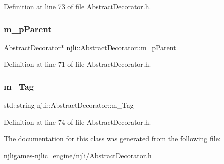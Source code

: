 Definition at line 73 of file Abstract\+Decorator.\+h.

\mbox{\label{classnjli_1_1_abstract_decorator_a2c8fc57dd9d1a874a23ae51277a8968d}} 
\subsubsection{\texorpdfstring{m\+\_\+p\+Parent}{m\_pParent}}
{\footnotesize\ttfamily \mbox{\hyperlink{classnjli_1_1_abstract_decorator}{Abstract\+Decorator}}$\ast$ njli\+::\+Abstract\+Decorator\+::m\+\_\+p\+Parent\hspace{0.3cm}{\ttfamily [private]}}



Definition at line 71 of file Abstract\+Decorator.\+h.

\mbox{\label{classnjli_1_1_abstract_decorator_a2a7abd533134461d07b660eba804cf48}} 
\subsubsection{\texorpdfstring{m\+\_\+\+Tag}{m\_Tag}}
{\footnotesize\ttfamily std\+::string njli\+::\+Abstract\+Decorator\+::m\+\_\+\+Tag\hspace{0.3cm}{\ttfamily [private]}}



Definition at line 74 of file Abstract\+Decorator.\+h.



The documentation for this class was generated from the following file\+:\begin{DoxyCompactItemize}
\item 
njligames-\/njlic\+\_\+engine/njli/\mbox{\hyperlink{_abstract_decorator_8h}{Abstract\+Decorator.\+h}}\end{DoxyCompactItemize}
